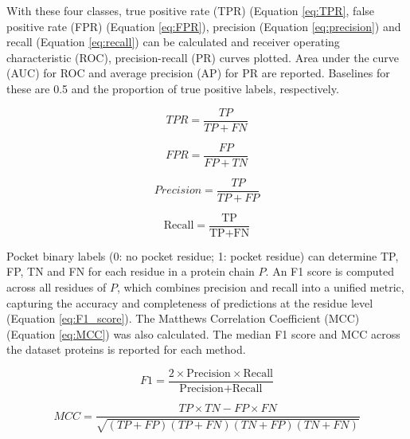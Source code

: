 With these four classes, true positive rate (TPR) (Equation \ref{eq:TPR}, false positive rate (FPR) (Equation \ref{eq:FPR}), precision (Equation \ref{eq:precision}) and recall (Equation \ref{eq:recall}) can be calculated and receiver operating characteristic (ROC), precision-recall (PR) curves plotted. Area under the curve (AUC) for ROC and average precision (AP) for PR are reported. Baselines for these are 0.5 and the proportion of true positive labels, respectively.

\begin{equation}
TPR = \frac{TP}{TP + FN}
\label{eq:TPR}
\end{equation}

\begin{equation}
FPR = \frac{FP}{FP + TN}
\label{eq:FPR}
\end{equation}

\begin{equation}
Precision = \frac{TP}{TP + FP}
\label{eq:precision}
\end{equation}

\begin{equation}
\text{Recall} = \frac{\text{TP}}{\text{TP} + \text{FN}}
\label{eq:recall}
\end{equation}

Pocket binary labels (0: no pocket residue; 1: pocket residue) can determine TP, FP, TN and FN for each residue in a protein chain $P$. An F1 score is computed across all residues of $P$, which combines precision and recall into a unified metric, capturing the accuracy and completeness of predictions at the residue level (Equation \ref{eq:F1_score}). The Matthews Correlation Coefficient (MCC) \cite{MATTHEWS_1975_MCC} (Equation \ref{eq:MCC}) was also calculated. The median F1 score and MCC across the dataset proteins is reported for each method.

\begin{equation}
F1 = \frac{2 \times \text{Precision} \times \text{Recall}}{\text{Precision} + \text{Recall}}
\label{eq:F1_score}
\end{equation}

\begin{equation}
MCC = \frac{TP \times TN - FP \times FN}{\sqrt{(TP + FP)(TP + FN)(TN + FP)(TN + FN)}}
\label{eq:MCC}
\end{equation}

